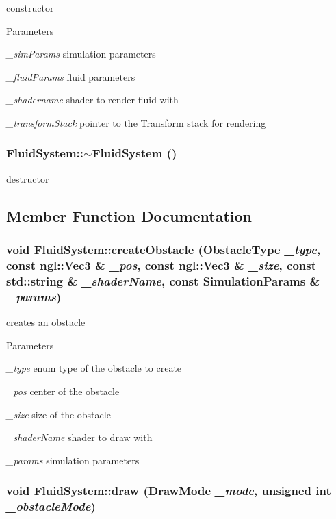 constructor 
\begin{DoxyParams}{Parameters}
\item[{\em \_\-simParams}]simulation parameters \item[{\em \_\-fluidParams}]fluid parameters \item[{\em \_\-shadername}]shader to render fluid with \item[{\em \_\-transformStack}]pointer to the Transform stack for rendering \end{DoxyParams}
\hypertarget{classFluidSystem_a568108df17c8fe0ec5fce2ad225ae0cc}{
\subsubsection[{$\sim$FluidSystem}]{\setlength{\rightskip}{0pt plus 5cm}FluidSystem::$\sim$FluidSystem ()}}
\label{classFluidSystem_a568108df17c8fe0ec5fce2ad225ae0cc}


destructor 

\subsection{Member Function Documentation}
\hypertarget{classFluidSystem_a6e6cf643c1a801897ddb18b1581bc882}{
\subsubsection[{createObstacle}]{\setlength{\rightskip}{0pt plus 5cm}void FluidSystem::createObstacle ({\bf ObstacleType} {\em \_\-type}, \/  const ngl::Vec3 \& {\em \_\-pos}, \/  const ngl::Vec3 \& {\em \_\-size}, \/  const std::string \& {\em \_\-shaderName}, \/  const {\bf SimulationParams} \& {\em \_\-params})}}
\label{classFluidSystem_a6e6cf643c1a801897ddb18b1581bc882}


creates an obstacle 
\begin{DoxyParams}{Parameters}
\item[{\em \_\-type}]enum type of the obstacle to create \item[{\em \_\-pos}]center of the obstacle \item[{\em \_\-size}]size of the obstacle \item[{\em \_\-shaderName}]shader to draw with \item[{\em \_\-params}]simulation parameters \end{DoxyParams}
\hypertarget{classFluidSystem_ab2e10707d179033c443eebb39f41ae6e}{
\subsubsection[{draw}]{\setlength{\rightskip}{0pt plus 5cm}void FluidSystem::draw ({\bf DrawMode} {\em \_\-mode}, \/  unsigned int {\em \_\-obstacleMode})}}
\label{classFluidSystem_ab2e10707d179033c443eebb39f41ae6e}


